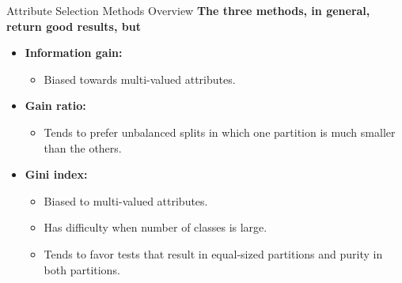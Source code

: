 \begin{frame}{Attribute Selection Methods Overview}
	\textbf{The three methods, in general, return good results, but}
	\begin{itemize}
		\item \textbf{\color{airforceblue}Information gain:}
		      \begin{itemize}
			      \item Biased towards multi-valued attributes.
		      \end{itemize}
		\item \textbf{\color{airforceblue}Gain ratio:}
		      \begin{itemize}
			      \item Tends to prefer unbalanced splits in which one partition is much smaller than the others.
		      \end{itemize}
		\item \textbf{\color{airforceblue}Gini index:}
		      \begin{itemize}
			      \item Biased to multi-valued attributes.
			      \item Has difficulty when number of classes is large.
			      \item Tends to favor tests that result in equal-sized partitions and purity in both partitions.
		      \end{itemize}
	\end{itemize}
\end{frame}

